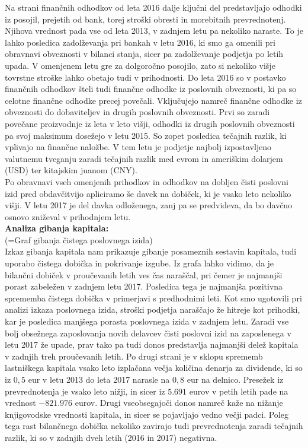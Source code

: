 \documentclass[12pt,a4paper]{amsart}
\theoremstyle{definition} %
\theoremstyle{plain} %
\begin{document}
 Na strani finančnih odhodkov od leta 2016 dalje ključni del predstavljajo odhodki iz posojil, prejetih od bank, torej stroški obresti in morebitnih prevrednotenj. Njihova vrednost pada vse od leta 2013, v zadnjem letu pa nekoliko naraste. To je lahko posledica zadolževanja pri bankah v letu 2016, ki smo ga omenili pri obravnavi obveznosti v bilanci stanja, sicer pa zadolževanje podjetja po letih upada. V omenjenem letu gre za dolgoročno posojilo, zato si nekoliko višje tovrstne stroške lahko obetajo tudi v prihodnosti. Do leta 2016 so v postavko finančnih odhodkov šteli tudi finančne odhodke iz poslovnih obveznosti, ki pa so celotne finančne odhodke precej povečali. Vključujejo namreč finančne odhodke iz obveznosti do dobaviteljev in drugih poslovnih obveznosti. Prvi so zaradi povečane proizvodnje iz leta v leto višji, odhodki iz drugih poslovnih obveznosti pa svoj maksimum dosežejo v letu 2015. So zopet posledica tečajnih razlik, ki vplivajo na finančne naložbe. V tem letu je podjetje najbolj izpostavljeno valutnemu tveganju zaradi tečajnih razlik med evrom in ameriškim dolarjem (USD) ter kitajskim juanom (CNY).\\
Po obravnavi vseh omenjenih prihodkov in odhodkov na dobljen čisti poslovni izid pred obdavčitvijo apliciramo še davek na dobiček, ki je vsako leto nekoliko višji. V letu 2017 je del davka odloženega, zanj pa se predvideva, da bo davčno osnovo zniževal v prihodnjem letu.\\ 
  
\textbf{Analiza gibanja kapitala:}\\
(=Graf gibanja čistega poslovnega izida)\\
Izkaz gibanja kapitala nam prikazuje gibanje posameznih sestavin kapitala, tudi uporabo čistega dobička in pokrivanje izgube. Iz grafa lahko vidimo, da je bilančni dobiček v proučevanih letih ves čas naraščal, pri čemer je najmanjši porast zabeležen v zadnjem letu 2017. Posledica tega je najmanjša pozitivna sprememba čistega dobička v primerjavi s predhodnimi leti. Kot smo ugotovili pri analizi izkaza poslovnega izida, stroški podjetja naraščajo že hitreje kot prihodki, kar je posledica manjšega porasta poslovnega izida v zadnjem letu. Zaradi vse bolj obsežnega zaposlovanja novih delavcev čisti poslovni izid na zaposlenega v letu 2017 že upade, prav tako pa tudi donos predstavlja najmanjši delež kapitala v zadnjih treh proučevanih letih. Po drugi strani je v sklopu sprememb lastniškega kapitala vsako leto izplačana večja količina denarja za dividende, ki so iz $0,5$ eur v letu 2013 do leta 2017 narasle na $0,8$ eur na delnico. Presežek iz prevrednotenja je vsako leto nižji, in sicer iz $5.691$ eurov v petih letih pade na vrednost $-821.976$ eurov. Drugi vseobsegajoči donos namreč kaže na nižanje knjigovodske vrednosti kapitala, in sicer se pojavljajo vedno večji padci. Poleg tega rast bilančnega dobička nekoliko zavirajo tudi prevrednotenja zaradi tečajnih razlik, ki so v zadnjih dveh letih (2016 in 2017) negativna.  \\
\end{document}
